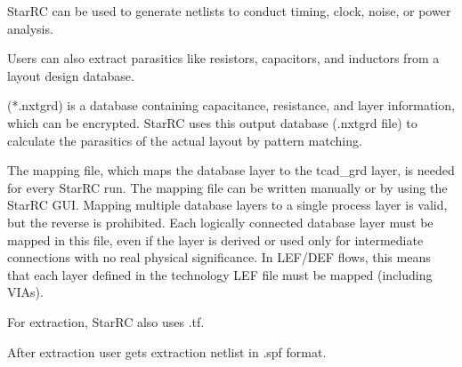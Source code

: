 \documentclass[a4paper,12pt,twoside]{article}
\begin{document}
StarRC can be used to generate netlists to conduct timing, clock, noise, or power analysis.

Users can also extract parasitics like resistors, capacitors, and inductors from a layout design database.

(*.nxtgrd) is a database containing capacitance, resistance, and layer information, which can be encrypted. StarRC uses this output database (.nxtgrd file) to calculate the parasitics of the actual layout by pattern matching.

The mapping file, which maps the database layer to the tcad\_grd layer, is needed for every StarRC run. The mapping file can be written manually or by using the StarRC GUI. Mapping multiple database layers to a single process layer is valid, but the reverse is prohibited. Each logically connected database layer must be mapped in this file, even if the layer is derived or used only for intermediate connections with no real physical significance. In LEF/DEF flows, this means that each layer defined in the technology LEF file must be mapped (including VIAs).

For extraction, StarRC also uses .tf.

After extraction user gets extraction netlist in .spf format.
\end{document}
